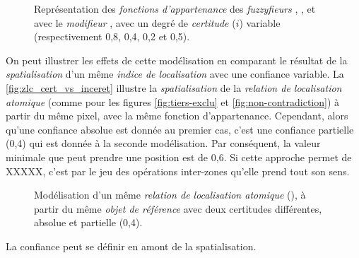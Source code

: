 \begin{figure}
  \centering  \subfloat[\label{fig:fnc_app_inc}]{}\hfill
  \subfloat[\label{fig:fnc_app_inc_2}]{}

  \subfloat[\label{fig:fnc_app_inc_3}]{}\hfill
  \subfloat[\label{fig:fnc_app_inc_4}]{}
  \caption[Représentation des \emph{fonctions d'appartenance} de
  différents \emph{fuzzyfieurs} avec une
  \emph{incertitude}]{Représentation des \emph{fonctions
      d'appartenance} des \emph{fuzzyfieurs}
    \protect{} \protect{},
    \protect{} \protect{},
    \protect{} \protect{}
    et \protect{} avec le \emph{modifieur}
    \protect{} \protect{}, avec
    un degré de \emph{certitude} (\(i\)) variable (respectivement
    0,8, 0,4, 0,2 et 0,5).}
  \label{fig:fnc_incert}
\end{figure}

On peut illustrer les effets de cette modélisation en comparant le
résultat de la \emph{spatialisation} d'un même \emph{indice de
  localisation} avec une confiance variable. La
\autoref{fig:zlc_cert_vs_inceret} illustre la \emph{spatialisation} de
la \emph{relation de localisation atomique} 
(comme pour les figures \ref{fig:tiers-exclu} et
\ref{fig:non-contradiction}) à partir du même pixel, avec la même
fonction d'appartenance. Cependant, alors qu'une confiance absolue est
donnée au premier cas, c'est une confiance partielle (0,4) qui est
donnée à la seconde modélisation. Par conséquent, la valeur minimale
que peut prendre une position est de 0,6. Si cette approche permet de
XXXXX, c'est par le jeu des opérations inter-zones qu'elle prend tout
son sens.

\begin{figure}
  \centering
  \subfloat[]{}\hspace{2cm}
  \subfloat[]{}
  \caption{Modélisation d'un même \emph{relation de localisation
      atomique} (\protect{}), à partir du même
    \emph{objet de référence} avec deux certitudes différentes,
    absolue et partielle (0,4).}
  \label{fig:zlc_cert_vs_inceret}
\end{figure}


La confiance peut se définir en amont de la spatialisation.

